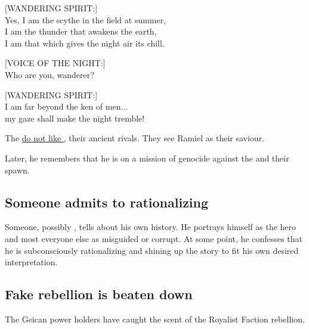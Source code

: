 \begin{garbage}
{  [WANDERING SPIRIT:]\\
  Yes, I am the scythe in the field at summer,\\
  I am the thunder that awakens the earth,\\
  I am that which gives the night air its chill.
  
  [VOICE OF THE NIGHT:]\\
  Who are you, wanderer?
  
  [WANDERING SPIRIT:]\\
  I am far beyond the ken of men...\\
  my gaze shall make the night tremble!
}

The \vorcanths{} \hyperref[Moon-Wolves dislike Dragons]{do not like \dragons}, their ancient rivals. They see Ramiel as their saviour.


Later, he remembers that he is on a mission of genocide against the \dragons{} and their spawn.








\subsection{Someone admits to rationalizing}
Someone, possibly \Ishna, tells about his own history. He portrays himself as the hero and most everyone else as misguided or corrupt. At some point, he confesses that he is subconsciously rationalizing and shining up the story to fit his own desired interpretation. 







\subsection{Fake rebellion is beaten down}
The Geican power holders have caught the scent of the Royalist Faction rebellion. 


\end{garbage}
